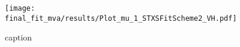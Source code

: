 \begin{figure}[hb]
	\centering
	\texttt{[image: final\_fit\_mva/results/Plot\_mu\_1\_STXSFitScheme2\_VH.pdf]}
  \caption{caption}
  \label{fig:WZH-mus}
\end{figure}
